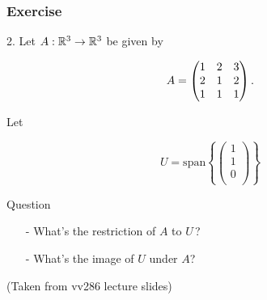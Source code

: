 \documentclass{beamer}
\begin{document}
\begin{frame}
    \frametitle{Exercise}
    2. Let $A: \mathbb{R}^3 \to \mathbb{R}^3 $ be given by
    \begin{small}
        \begin{equation*}
            A=\begin{pmatrix} 1 &2 &3 \\ 2 &1 &2 \\ 1 &1 &1 \\ \end{pmatrix}.
        \end{equation*}
    \end{small}
    Let 
    \begin{small}
        \begin{equation*}
            U=\text{span} {\left \{\begin{pmatrix}1\\1\\0\\\end{pmatrix}\right \} }
        \end{equation*} 
    \end{small}
    \begin{block}{Question}
        \begin{itemize}
            \item[-]What's the restriction of $A$ to $U\,$? 
            \item[-]What's the image of $U$ under $A$?
        \end{itemize}
    \end{block}
    (Taken from vv286 lecture slides)
\end{frame}
\end{document}
